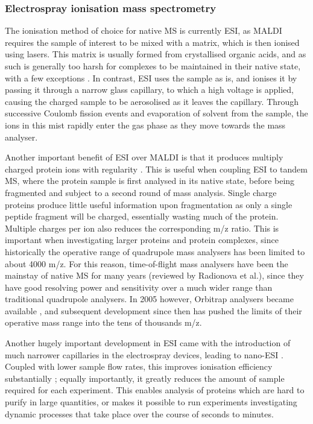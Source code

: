 \documentclass[a4paper,11pt,twoside,openright]{scrbook}
\begin{document}
\subsubsection{Electrospray ionisation mass spectrometry}
The ionisation method of choice for native MS is currently ESI, as MALDI requires the sample of interest to be mixed with a matrix, which is then ionised using lasers. This matrix is usually formed from crystallised organic acids, and as such is generally too harsh for complexes to be maintained in their native state, with a few exceptions \cite{Song2007}. In contrast, ESI uses the sample as is, and ionises it by passing it through a narrow glass capillary, to which a high voltage is applied, causing the charged sample to be aerosolised as it leaves the capillary. Through successive Coulomb fission events and evaporation of solvent from the sample, the ions in this mist rapidly enter the gas phase as they move towards the mass analyser.

Another important benefit of ESI over MALDI is that it produces multiply charged protein ions with regularity \cite{Krusemark2009}. This is useful when coupling ESI to tandem MS, where the protein sample is first analysed in its native state, before being fragmented and subject to a second round of mass analysis. Single charge proteins produce little useful information upon fragmentation as only a single peptide fragment will be charged, essentially wasting much of the protein. Multiple charges per ion also reduces the corresponding m/z ratio. This is important when investigating larger proteins and protein complexes, since historically the operative range of quadrupole mass analysers has been limited to about 4000 m/z. For this reason, time-of-flight mass analysers have been the mainstay of native MS for many years (reviewed by Radionova et al.\cite{Radionova2016}), since they have good resolving power and sensitivity over a much wider range than traditional quadrupole analysers. In 2005 however, Orbitrap analysers became available \cite{Hu2005}, and subsequent development since then has pushed the limits of their operative mass range into the tens of thousands m/z.

Another hugely important development in ESI came with the introduction of much narrower capillaries in the electrospray devices, leading to nano-ESI \cite{Wilm1994}. Coupled with lower sample flow rates, this improves ionisation efficiency substantially \cite{El-Faramawy2005}; equally importantly, it greatly reduces the amount of sample required for each experiment. This enables analysis of proteins which are hard to purify in large quantities, or makes it possible to run experiments investigating dynamic processes that take place over the course of seconds to minutes.
\end{document}
